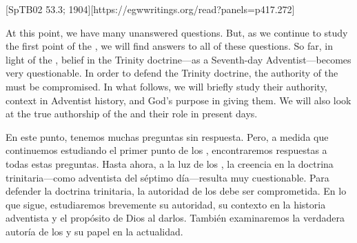 [SpTB02 53.3; 1904][https://egwwritings.org/read?panels=p417.272]


At this point, we have many unanswered questions. But, as we continue to study the first point of the , we will find answers to all of these questions. So far, in light of the , belief in the Trinity doctrine—as a Seventh-day Adventist—becomes very questionable. In order to defend the Trinity doctrine, the authority of the  must be compromised. In what follows, we will briefly study their authority, context in Adventist history, and God’s purpose in giving them. We will also look at the true authorship of the  and their role in present days.


En este punto, tenemos muchas preguntas sin respuesta. Pero, a medida que continuemos estudiando el primer punto de los , encontraremos respuestas a todas estas preguntas. Hasta ahora, a la luz de los , la creencia en la doctrina trinitaria—como adventista del séptimo día—resulta muy cuestionable. Para defender la doctrina trinitaria, la autoridad de los  debe ser comprometida. En lo que sigue, estudiaremos brevemente su autoridad, su contexto en la historia adventista y el propósito de Dios al darlos. También examinaremos la verdadera autoría de los  y su papel en la actualidad.





% 
